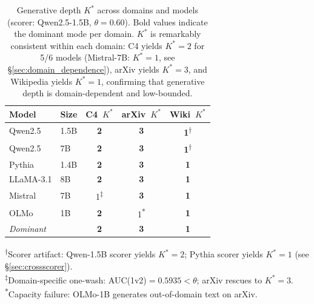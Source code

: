 \begin{table}[t]
\centering
\caption{Generative depth $K^*$ across domains and models (scorer: Qwen2.5-1.5B, $\theta{=}0.60$). Bold values indicate the dominant mode per domain. $K^*$ is remarkably consistent within each domain: C4 yields $K^*{=}2$ for 5/6 models (Mistral-7B: $K^*{=}1$, see \S\ref{sec:domain_dependence}), arXiv yields $K^*{=}3$, and Wikipedia yields $K^*{=}1$, confirming that generative depth is domain-dependent and low-bounded.}
\label{tab:domain_model_kstar}
{\small
\begin{tabular}{llccc}
\toprule
\textbf{Model} & \textbf{Size} & \textbf{C4}~$K^*$ & \textbf{arXiv}~$K^*$ & \textbf{Wiki}~$K^*$ \\
\midrule
Qwen2.5       & 1.5B & \textbf{2} & \textbf{3} & \textbf{1}\textsuperscript{$\dagger$} \\
Qwen2.5       & 7B   & \textbf{2} & \textbf{3} & \textbf{1}\textsuperscript{$\dagger$} \\
Pythia        & 1.4B & \textbf{2} & \textbf{3} & \textbf{1} \\
LLaMA-3.1    & 8B   & \textbf{2} & \textbf{3} & \textbf{1} \\
Mistral       & 7B   & 1\textsuperscript{$\ddagger$} & \textbf{3} & \textbf{1} \\
OLMo          & 1B   & \textbf{2} & 1\textsuperscript{$*$} & \textbf{1} \\
\midrule
\textit{Dominant} & & \textbf{2} & \textbf{3} & \textbf{1} \\
\bottomrule
\end{tabular}
}
\vspace{2pt}

{\footnotesize
\textsuperscript{$\dagger$}Scorer artifact: Qwen-1.5B scorer yields $K^*{=}2$; Pythia scorer yields $K^*{=}1$ (see \S\ref{sec:crossscorer}).\\
\textsuperscript{$\ddagger$}Domain-specific one-wash: AUC(1v2)${=}0.5935{<}\theta$; arXiv rescues to $K^*{=}3$.\\
\textsuperscript{$*$}Capacity failure: OLMo-1B generates out-of-domain text on arXiv.
}
\end{table}
